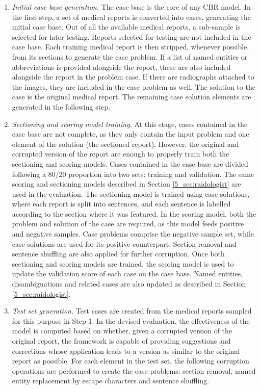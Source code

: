 \begin{enumerate}
    \item \textit{Initial case base generation.} The case base is the core of any CBR model. In the first step, a set of medical reports is converted into cases, generating the initial case base. Out of all the available medical reports, a sub-sample is selected for later testing. Reports selected for testing are not included in the case base. Each training medical report is then stripped, whenever possible, from its sections to generate the case problem. If a list of named entities or abbreviations is provided alongside the report, these are also included alongside the report in the problem case. If there are radiographs attached to the images, they are included in the case problem as well. The solution to the case is the original medical report. The remaining case solution elements are generated in the following step.
    
    \item \textit{Sectioning and scoring model training.} At this stage, cases contained in the case base are not complete, as they only contain the input problem and one element of the solution (the sectioned report). However, the original and corrupted version of the report are enough to properly train both the sectioning and scoring models. Cases contained in the case base are divided following a 80/20 proportion into two sets: training and validation. The same scoring and sectioning models described in Section \ref{5_sec:raidologist} are used in the evaluation. The sectioning model is trained using case solutions, where each report is split into sentences, and each sentence is labelled according to the section where it was featured. In the scoring model, both the problem and solution of the case are required, as this model feeds positive and negative samples. Case problems comprise the negative sample set, while case solutions are used for its positive counterpart. Section removal and sentence shuffling are also applied for further corruption. Once both sectioning and scoring models are trained, the scoring model is used to update the validation score of each case on the case base. Named entities, disambiguations and related cases are also updated as described in Section \ref{5_sec:raidologist}.
    
    \item \textit{Test set generation.} Test cases are created from the medical reports sampled for this purpose in Step 1. In the devised evaluation, the effectiveness of the model is computed based on whether, given a corrupted version of the original report, the framework is capable of providing suggestions and corrections whose application leads to a version as similar to the original report as possible. For each element in the test set, the following corruption operations are performed to create the case problems: section removal, named entity replacement by escape characters and sentence shuffling.
    

\end{enumerate}
